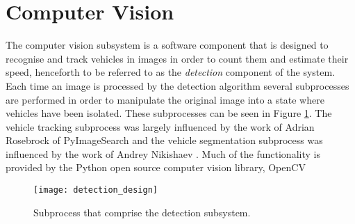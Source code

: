 \section{Computer Vision}

The computer vision subsystem is a software component that is designed to recognise and track vehicles in images in order to count them and estimate their speed, henceforth to be referred to as the \emph{detection} component of the system. Each time an image is processed by the detection algorithm several subprocesses are performed in order to manipulate the original image into a state where vehicles have been isolated. These subprocesses can be seen in Figure \ref{fig:detection_design}. The vehicle tracking subprocess was largely influenced by the work of Adrian Rosebrock \cite{adrian_rosebrock_simple_object_tracking}\cite{adrian_rosebrock_vehicle_tracking} of PyImageSearch and the vehicle segmentation subprocess was influenced by the work of Andrey Nikishaev \cite{andrey_nikishaev_traffic_counting}. Much of the functionality is provided by the Python open source computer vision library, OpenCV \cite{opencv}


\begin{figure}[H]
    \texttt{[image: detection\_design]}
    \caption{Subprocess that comprise the detection subsystem.}
    \label{fig:detection_design}
\end{figure}


